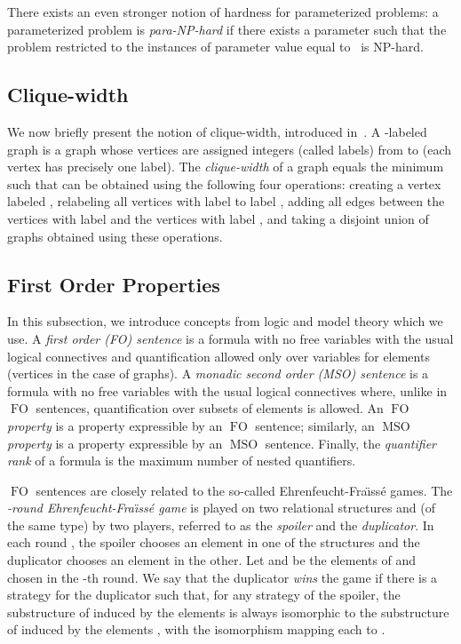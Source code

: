\documentclass{CSML}
\newcommand{\FO}{\ensuremath{\operatorname{FO}}\xspace}
\newcommand{\MSO}{\ensuremath{\operatorname{MSO}}\xspace}
\theoremstyle{plain}\newtheorem{claim}[thm]{Claim}
\begin{document}
There exists an even stronger notion of hardness for parameterized
problems: a parameterized problem is \emph{para-\textup{NP}-hard}
if there exists a parameter  such that the problem restricted to
the instances  of parameter value equal to~ is NP-hard.

\subsection{Clique-width}

We now briefly present the notion of clique-width, introduced in~\cite{co00}.
A -labeled graph is a graph whose vertices are assigned integers (called
labels) from  to  (each vertex has precisely one label).  The {\em
  clique-width} of a graph  equals the minimum  such that  can be
obtained using the following four operations: creating a vertex labeled 
, relabeling all vertices with label  to label , adding all edges between
the vertices with label  and the vertices with label , and
taking a disjoint union of graphs obtained using these operations.

\subsection{First Order Properties}

In this subsection,
we introduce concepts from logic and model theory which we use. A {\em first order (FO) sentence}
is a formula with no free variables with the usual logical connectives and quantification allowed only
over variables for elements (vertices in the case of graphs).
A {\em monadic second order (MSO) sentence}
is a formula with no free variables with the usual logical connectives where, unlike in \FO sentences, quantification over subsets
of elements is allowed. An {\em \FO property} is a property expressible by an \FO sentence; similarly,
an {\em \MSO property} is a property expressible by an \MSO sentence.
Finally, the {\em quantifier rank} of a formula is the maximum number of nested quantifiers.

\FO sentences are closely related to the so-called Ehrenfeucht-Fra{\"\i}ss\'e games.
The {\em -round Ehrenfeucht-Fra{\"\i}ss\'e game} is played on two relational structures  and  (of the same type)
by two players, referred to as the {\em spoiler} and the {\em duplicator}. 
In each round ,
the spoiler chooses an element in one of the structures and the duplicator chooses an element in the other.
Let  and  be the elements of  and  chosen in the -th round.
We say that the duplicator {\em wins} the game if there is a strategy for the duplicator such that, for any strategy of the spoiler, 
the substructure of  induced by the elements  is always isomorphic
to the substructure of  induced by the elements , with the isomorphism mapping each  to .
\end{document}
